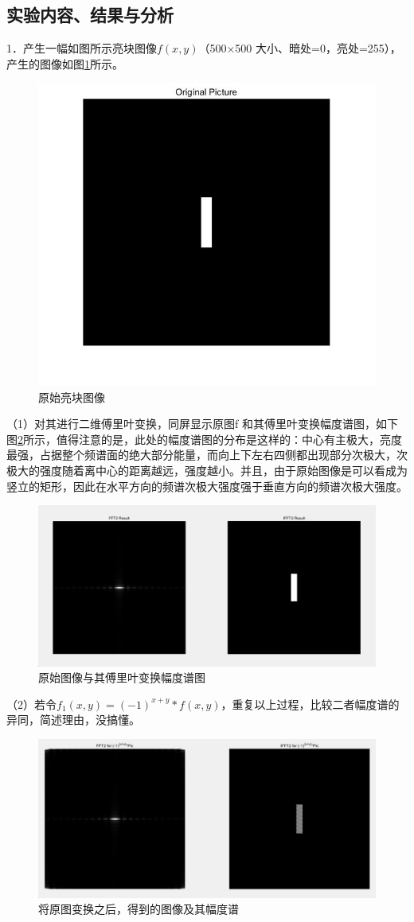 \documentclass[UTF8]{article} %
\begin{document}
	\subsection{实验内容、结果与分析}
	1．产生一幅如图所示亮块图像$f(x,y)$（500×500 大小、暗处=0，亮处=255），产生的图像如图\ref{fig:2-1}所示。
	\begin{figure}[H]
		\centering
		\includegraphics[width=0.5\linewidth]{2-1}
		\caption{原始亮块图像}
		\label{fig:2-1}
	\end{figure}
	
	（1）对其进行二维傅里叶变换，同屏显示原图f 和其傅里叶变换幅度谱图，如下图\ref{fig:2-2}所示，值得注意的是，此处的幅度谱图的分布是这样的：中心有主极大，亮度最强，占据整个频谱面的绝大部分能量，而向上下左右四侧都出现部分次极大，次极大的强度随着离中心的距离越远，强度越小。并且，由于原始图像是可以看成为竖立的矩形，因此在水平方向的频谱次极大强度强于垂直方向的频谱次极大强度。
	\begin{figure}[H]
		\centering
		\includegraphics[width=0.7\linewidth]{screenshot001}
		\caption{原始图像与其傅里叶变换幅度谱图}
		\label{fig:2-2}
	\end{figure}
	
	（2）若令$f_{1}(x,y)=(-1)^{x+y}* f(x,y)$，重复以上过程，比较二者幅度谱的异同，简述理由，没搞懂。
	\begin{figure}[H]
		\centering
		\includegraphics[width=0.7\linewidth]{screenshot005}
		\caption{将原图变换之后，得到的图像及其幅度谱}
		\label{fig:2-3}
	\end{figure}
	
\end{document}
